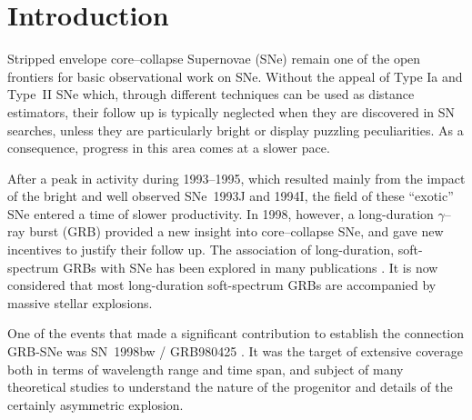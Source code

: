 \documentclass[12pt,preprint]{aastex}
\begin{document}
\section{Introduction}

Stripped envelope core--collapse Supernovae (SNe) remain one of the open frontiers for basic observational work on SNe.
%
Without the appeal of Type Ia and Type~II SNe which, through different
techniques can be used as distance estimators, their follow up is typically
neglected when they are discovered in SN searches, unless they are particularly
bright or display puzzling peculiarities.
%
As a consequence, progress in this area comes at a slower pace.

After a peak in activity during 1993--1995, which resulted mainly
from the impact of the bright and well observed SNe~1993J and 1994I, the field of these ``exotic''
SNe entered a time of slower productivity.
%
In 1998, however, a long-duration $\gamma$--ray burst (GRB) provided a new insight
into core--collapse SNe, and gave new incentives to justify their follow up.
%
The association of long-duration, soft-spectrum  GRBs with SNe has been explored
in many publications \citep{wandb06, hartmann10, wanda10}.
%
It is now considered that most
long-duration soft-spectrum GRBs are accompanied by massive stellar explosions.

One of the events that made a significant contribution to establish
the connection GRB-SNe was SN~1998bw / GRB980425 \citep{getal98}.
%
It was the target of extensive coverage both in terms of wavelength range
and time span, and subject of many theoretical studies to understand the
nature of the progenitor and details of the certainly asymmetric
explosion.
\end{document}
